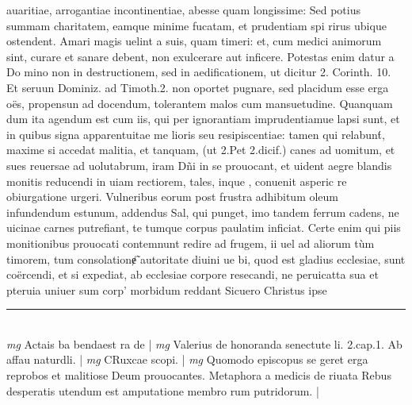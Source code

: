 \documentclass{article}
\begin{document}
\begin{pages}
auaritiae, arrogantiae incontinentiae, abesse quam longissime: Sed potius summam charitatem, eamque minime fucatam, et prudentiam spi rirus ubique ostendent. Amari magis uelint a suis, quam timeri: et, cum medici animorum sint, curare et sanare debent, non exulcerare aut inficere. Potestas enim datur a Do mino non in destructionem, sed in aedificationem, ut dicitur 2. Corinth. 10. Et seruun Dominiz. ad Timoth.2. non oportet pugnare, sed placidum esse erga oës, propensun ad docendum, tolerantem malos cum mansuetudine. Quanquam dum ita agendum est cum iis, qui per ignorantiam imprudentiamue lapsi sunt, et in quibus signa apparentuitae me lioris seu resipiscentiae: tamen qui relabunt́, maxime si accedat malitia, et tanquam, (ut 2.Pet 2.dicif.) canes ad uomitum, et sues reuersae ad uolutabrum, iram Dñi in se prouocant, et uident aegre blandis monitis reducendi in uiam rectiorem, tales, inque , conuenit asperic re obiurgatione urgeri. Vulneribus eorum post frustra adhibitum oleum infundendum estunum, addendus Sal, qui punget, imo tandem ferrum cadens, ne uicinae carnes putrefiant, te tumque corpus paulatim inficiat. Certe enim qui piis monitionibus prouocati contemnunt redire ad frugem, ii uel ad aliorum tùm timorem, tum consolationɇ̃ autoritate diuini ue bi, quod est gladius ecclesiae, sunt coërcendi, et si expediat, ab ecclesiae corpore resecandi, ne peruicatta sua et pteruia uniuer sum corp' morbidum reddant Sicuero Christus ipse  \pend
\vspace{0.5cm}\noindent
\vspace{0.2cm}\rule{1cm}{0.2pt}\\ 
\hspace{0.2cm}\textit{mg}
\footnotesize Actais ba bendaest ra de
\normalsize| 
\hspace{0.2cm}\textit{mg}
\footnotesize Valerius de honoranda senectute li. 2.cap.1. Ab affau naturdli. 
\normalsize| 
\hspace{0.2cm}\textit{mg}
\footnotesize CRuxcae scopi. 
\normalsize| 
\hspace{0.2cm}\textit{mg}
\footnotesize Quomodo episcopus se geret erga reprobos et malitiose Deum prouocantes. Metaphora a medicis de riuata Rebus desperatis utendum est amputatione membro rum putridorum. 
\normalsize| 

\end{pages}
\end{document}
